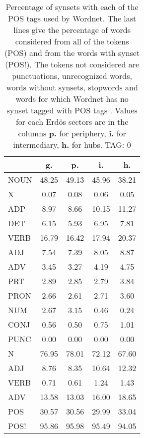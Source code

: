 \begin{table}[h!]
\begin{center}
\begin{tabular}{| l || c | c | c | c |}\hline
 & {\bf g.} & {\bf p.} & {\bf i.} & {\bf h.} \\\hline\hline
NOUN & 48.25  & 49.13  & 45.96  & 38.21 \\
X & 0.07  & 0.08  & 0.06  & 0.05 \\\hline
ADP & 8.97  & 8.66  & 10.15  & 11.27 \\
DET & 6.15  & 5.93  & 6.95  & 7.81 \\\hline
VERB & 16.79  & 16.42  & 17.94  & 20.37 \\\hline
ADJ & 7.54  & 7.39  & 8.05  & 8.87 \\
ADV & 3.45  & 3.27  & 4.19  & 4.75 \\\hline
PRT & 2.89  & 2.85  & 2.79  & 3.84 \\
PRON & 2.66  & 2.61  & 2.71  & 3.60 \\
NUM & 2.67  & 3.15  & 0.46  & 0.24 \\
CONJ & 0.56  & 0.50  & 0.75  & 1.01 \\
PUNC & 0.00  & 0.00  & 0.00  & 0.00 \\\hline\hline\hline
N & 76.95  & 78.01  & 72.12  & 67.60 \\\hline
ADJ & 8.76  & 8.35  & 10.64  & 12.32 \\\hline
VERB & 0.71  & 0.61  & 1.24  & 1.43 \\\hline
ADV & 13.58  & 13.03  & 16.00  & 18.65 \\\hline\hline
POS & 30.57  & 30.56  & 29.99  & 33.04 \\\hline
POS! & 95.86  & 95.98  & 95.49  & 94.05 \\\hline
\end{tabular}
\caption{Percentage of synsets with each of the POS tags used by Wordnet. The last lines give the percentage of words considered from all of the tokens (POS) and from the words with synset (POS!). The tokens not considered are punctuations, unrecognized words, words without synsets, stopwords and words for which Wordnet has no synset  tagged with POS tags . Values for each Erd\"os sectors are in the columns {{\bf p.}} for periphery, {{\bf i.}} for intermediary, {{\bf h.}} for hubs. TAG: 0}
\end{center}
\end{table}